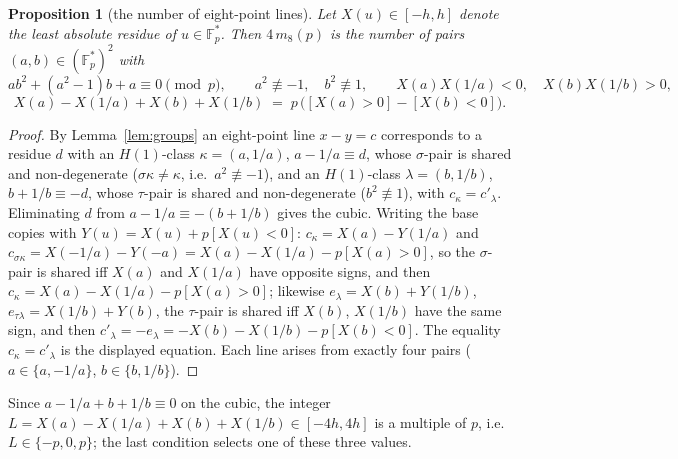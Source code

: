 \documentclass[11pt]{article}
\newtheorem{proposition}[theorem]{Proposition}
\theoremstyle{remark}
\newcommand{\Fp}{\mathbb{F}_p}
\begin{document}
\begin{proposition}[the number of eight-point lines]\label{prop:m8}
Let $X(u)\in[-h,h]$ denote the least absolute residue of $u\in\Fp^*$.  Then $4\,m_8(p)$ is the number of pairs $(a,b)\in(\Fp^*)^2$ with
\[
 ab^2+(a^2-1)b+a\equiv0\pmod p,\qquad a^2\not\equiv-1,\quad b^2\not\equiv1,\qquad X(a)X(1/a)<0,\quad X(b)X(1/b)>0,
\]
\[
 X(a)-X(1/a)+X(b)+X(1/b)\;=\;p\,\bigl([X(a)>0]-[X(b)<0]\bigr).
\]
\end{proposition}
\begin{proof}
By Lemma~\ref{lem:groups} an eight-point line $x-y=c$ corresponds to a residue $d$ with an $H(1)$-class $\kappa=(a,1/a)$, $a-1/a\equiv d$,
whose $\sigma$-pair is shared and non-degenerate ($\sigma\kappa\ne\kappa$, i.e.\ $a^2\not\equiv-1$), and an $H(1)$-class $\lambda=(b,1/b)$,
$b+1/b\equiv-d$, whose $\tau$-pair is shared and non-degenerate ($b^2\not\equiv1$), with $c_\kappa=c'_\lambda$.  Eliminating $d$ from
$a-1/a\equiv-(b+1/b)$ gives the cubic.  Writing the base copies with $Y(u)=X(u)+p[X(u)<0]$: $c_\kappa=X(a)-Y(1/a)$ and
$c_{\sigma\kappa}=X(-1/a)-Y(-a)=X(a)-X(1/a)-p[X(a)>0]$, so the $\sigma$-pair is shared iff $X(a)$ and $X(1/a)$ have opposite signs, and then
$c_\kappa=X(a)-X(1/a)-p[X(a)>0]$; likewise $e_\lambda=X(b)+Y(1/b)$, $e_{\tau\lambda}=X(1/b)+Y(b)$, the $\tau$-pair is shared iff $X(b)$, $X(1/b)$
have the same sign, and then $c'_\lambda=-e_\lambda=-X(b)-X(1/b)-p[X(b)<0]$.  The equality $c_\kappa=c'_\lambda$ is the displayed equation.
Each line arises from exactly four pairs ($a\in\{a,-1/a\}$, $b\in\{b,1/b\}$).
\end{proof}
Since $a-1/a+b+1/b\equiv0$ on the cubic, the integer $L=X(a)-X(1/a)+X(b)+X(1/b)\in[-4h,4h]$ is a multiple of $p$, i.e.\ $L\in\{-p,0,p\}$;
the last condition selects one of these three values.
\end{document}
